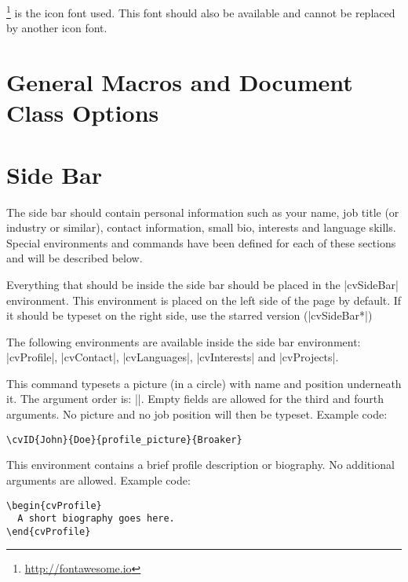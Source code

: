 \documentclass{ltxdoc}
\begin{document}
  \footnote{\url{http://fontawesome.io}} is the icon font used. This font should also be available and cannot be replaced by another icon font. 

\section{General Macros and Document Class Options}

\section{Side Bar}

  The side bar should contain personal information such as your name, job title (or industry or similar), contact information, small bio, interests and language skills. Special environments and commands have been defined for each of these sections and will be described below. 

  Everything that should be inside the side bar should be placed in the |cvSideBar| environment. This environment is placed on the left side of the page by default. If it should be typeset on the right side, use the starred version (|cvSideBar*|)

  The following environments are available inside the side bar environment: |cvProfile|, |cvContact|, |cvLanguages|, |cvInterests| and |cvProjects|.
  
  \DescribeMacro{\cvID}
  This command typesets a picture (in a circle) with name and position underneath it.
  The argument order is: ||. Empty fields are allowed for the third and fourth arguments. No picture and no job position will then be typeset. Example code: 
  \begin{lstlisting}
\cvID{John}{Doe}{profile_picture}{Broaker}
  \end{lstlisting}
  
  This environment contains a brief profile description or biography. No additional arguments are allowed. Example code:
  \begin{lstlisting}
\begin{cvProfile}
  A short biography goes here.
\end{cvProfile}
  \end{lstlisting}
  
\end{document}
